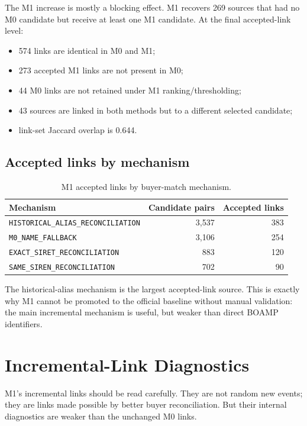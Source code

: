 \documentclass[11pt]{article}
\begin{document}
The M1 increase is mostly a blocking effect. M1 recovers 269 sources that
had no M0 candidate but receive at least one M1 candidate. At the final
accepted-link level:

\begin{itemize}
  \item 574 links are identical in M0 and M1;
  \item 273 accepted M1 links are not present in M0;
  \item 44 M0 links are not retained under M1 ranking/thresholding;
  \item 43 sources are linked in both methods but to a different selected
        candidate;
  \item link-set Jaccard overlap is 0.644.
\end{itemize}

\subsection{Accepted links by mechanism}

\begin{table}[h]
\centering
\caption{M1 accepted links by buyer-match mechanism.}
\begin{tabular}{lrr}
\toprule
Mechanism & Candidate pairs & Accepted links\\
\midrule
\texttt{HISTORICAL\_ALIAS\_RECONCILIATION} & 3,537 & 383\\
\texttt{M0\_NAME\_FALLBACK} & 3,106 & 254\\
\texttt{EXACT\_SIRET\_RECONCILIATION} & 883 & 120\\
\texttt{SAME\_SIREN\_RECONCILIATION} & 702 & 90\\
\bottomrule
\end{tabular}
\end{table}

The historical-alias mechanism is the largest accepted-link source. This
is exactly why M1 cannot be promoted to the official baseline without
manual validation: the main incremental mechanism is useful, but weaker
than direct BOAMP identifiers.

\section{Incremental-Link Diagnostics}
\label{sec:incremental}

M1's incremental links should be read carefully. They are not random new
events; they are links made possible by better buyer reconciliation. But
their internal diagnostics are weaker than the unchanged M0 links.
\end{document}
